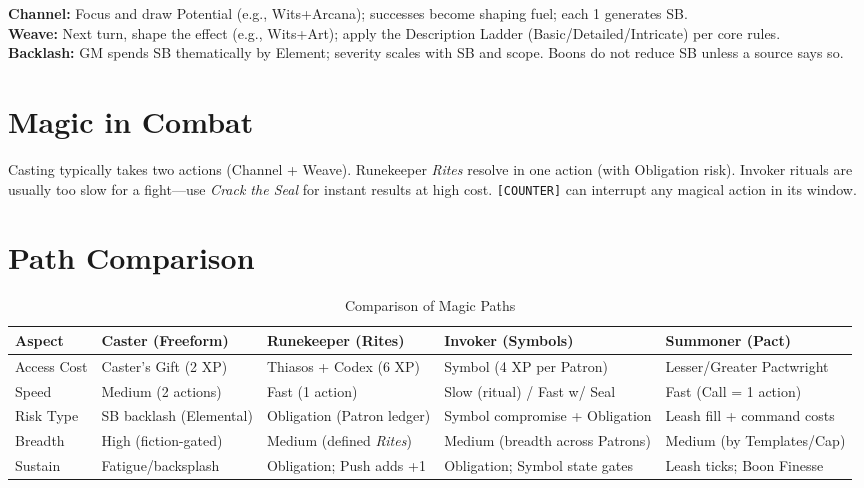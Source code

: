 \textbf{Channel:} Focus and draw Potential (e.g., Wits+Arcana); successes become shaping fuel; each 1 generates SB.\\
\textbf{Weave:} Next turn, shape the effect (e.g., Wits+Art); apply the Description Ladder (Basic/Detailed/Intricate) per core rules.\\
\textbf{Backlash:} GM spends SB thematically by Element; severity scales with SB and scope. Boons do not reduce SB unless a source says so.

\section{Magic in Combat}
\label{sec:magic-combat}

Casting typically takes two actions (Channel + Weave). Runekeeper \emph{Rites} resolve in one action (with Obligation risk). Invoker rituals are usually too slow for a fight—use \emph{Crack the Seal} for instant results at high cost. \texttt{[COUNTER]} can interrupt any magical action in its window.

\section{Path Comparison}
\label{sec:path-comparison}

\begin{table}[htbp]
\centering
\begin{tabular}{p{3.1cm}p{4cm}p{4cm}p{4cm}p{4cm}}
\toprule
\textbf{Aspect} & \textbf{Caster (Freeform)} & \textbf{Runekeeper (Rites)} & \textbf{Invoker (Symbols)} & \textbf{Summoner (Pact)} \\
\midrule
Access Cost & Caster's Gift (2 XP) & Thiasos + Codex (6 XP) & Symbol (4 XP per Patron) & Lesser/Greater Pactwright \\
Speed & Medium (2 actions) & Fast (1 action) & Slow (ritual) / Fast w/ Seal & Fast (Call = 1 action) \\
Risk Type & SB backlash (Elemental) & Obligation (Patron ledger) & Symbol compromise + Obligation & Leash fill + command costs \\
Breadth & High (fiction-gated) & Medium (defined \emph{Rites}) & Medium (breadth across Patrons) & Medium (by Templates/Cap) \\
Sustain & Fatigue/backsplash & Obligation; Push adds +1 & Obligation; Symbol state gates & Leash ticks; Boon Finesse \\
\bottomrule
\end{tabular}
\caption{Comparison of Magic Paths}
\end{table}

